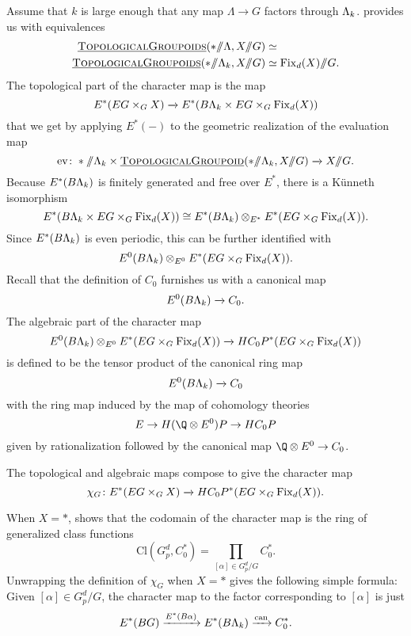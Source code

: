Assume that \(k\) is large enough that any map \(\Lambda \rightarrow G\) factors through \(\Lambda_k\).   provides us with equivalences
\begin{align*}
\InternalHom{TopologicalGroupoids}(* \mmod \Lambda, X \mmod G) & \simeq \\
\InternalHom{TopologicalGroupoids}(* \mmod \Lk, X \mmod G) & \simeq \Fix_d(X)\mmod G.
\end{align*}
The topological part of the character map is the map
\[
E^*(EG \times_G X) \xrightarrow{} E^*(B\Lambda_k \times EG\times_G \operatorname{Fix}_d(X))
\]
that we get by applying \(E^*(-)\) to the geometric realization of the evaluation map
\[
\mathrm{ev} \colon * \mmod \Lk \times \InternalHom{TopologicalGroupoid}(* \mmod \Lk, X \mmod G) \xrightarrow{} X \mmod G.
\]
Because \(E^*(B\Lambda_k)\) is finitely generated and free over \(E^*\), there is a K\"unneth isomorphism
\[
E^*(B\Lambda_k \times EG\times_G \operatorname{Fix}_d(X)) \cong E^*(B\Lambda_k) \otimes_{E^*} E^*(EG \times_G \operatorname{Fix}_d(X)).
\]
Since \(E^*(B\Lambda_k)\) is even periodic, this can be further identified with
\[
E^0(B\Lambda_k) \otimes_{E^0} E^*(EG \times_G \operatorname{Fix}_d(X)).
\]
Recall that the definition of \(C_0\) furnishes us with a canonical map
\[
E^0(B\Lambda_k) \xrightarrow{} C_0.
\]
The algebraic part of the character map
\[
E^0(B\Lambda_k) \otimes_{E^0} E^*(EG \times_G \operatorname{Fix}_d(X)) \xrightarrow{} HC_{0}P^{*}(EG \times_G \operatorname{Fix}_d(X)) 
\]
is defined to be the tensor product of the canonical ring map
\[
E^0(B\Lambda_k) \xrightarrow{} C_0
\]
with the ring map induced by the map of cohomology theories
\[
E \rightarrow H(\Q \otimes E^0)P \rightarrow HC_0P
\]
given by rationalization followed by the canonical map \(\Q \otimes E^0 \rightarrow C_0\).

The topological and algebraic maps compose to give the character map
\[
\chi_G \colon E^*(EG \times_G X) \xrightarrow{} HC_{0}P^{*}(EG \times_G \operatorname{Fix}_d(X)).
\]


\begin{example} \label{app:charmapexample}
When \(X = \ast\),  shows that the codomain of the character map is the ring of generalized class functions 
\[
\mathrm{Cl}(G_{p}^{d}, C_{0}^{*}) = \prod_{[\alpha] \in G_{p}^{d}/G} C_{0}^*. 
\]
Unwrapping the definition of \(\chi_G\) when \(X = \ast\) gives the following simple formula: Given \([\alpha] \in G_{p}^{d}/G\), the character map to the factor corresponding to \([\alpha]\) is just
\[
E^*(BG) \xrightarrow{E^*(B\alpha)} E^*(B\Lambda_k) \xrightarrow{\text{can}} C_{0}^{*}.
\]
\end{example}


